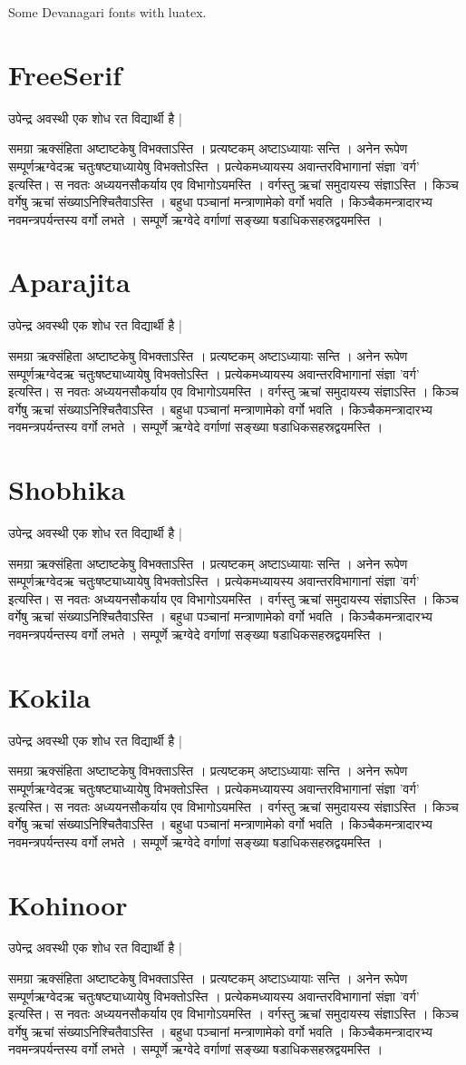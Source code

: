 \documentclass{article}
\newcommand\text{उपेन्द्र अवस्थी एक शोध रत विद्यार्थी है |%
\vskip3mm

समग्रा ऋक्संहिता अष्टाष्टकेषु विभक्ताऽस्ति । प्रत्यष्टकम् अष्टाऽध्यायाः
सन्ति । अनेन रूपेण सम्पूर्णऋग्वेदऋ चतुःषष्ट्याध्यायेषु विभक्तोऽस्ति ।
प्रत्येकमध्यायस्य अवान्तरविभागानां संज्ञा 'वर्ग' इत्यस्ति। स नवतः
अध्ययनसौकर्याय एव विभागोऽयमस्ति । वर्गस्तु ऋचां समुदायस्य संज्ञाऽस्ति ।
किञ्च वर्गेषु ऋचां संख्याऽनिश्चितैवाऽस्ति । बहुधा पञ्चानां
मन्त्राणामेको वर्गो भवति । किञ्चैकमन्त्रादारभ्य नवमन्त्रपर्यन्तस्य
वर्गो लभते । सम्पूर्णे ऋग्वेदे वर्गाणां सङ्ख्या षडाधिकसहस्रद्वयमस्ति ।}
\begin{document}
\raggedright

Some Devanagari fonts with luatex.

\section{FreeSerif}\fsfamily\text

\section{Aparajita}\apfamily\text

\section{Shobhika}\sbfamily\text

\section{Kokila}\kkfamily\text

\section{Kohinoor}\khfamily\text
\end{document}
